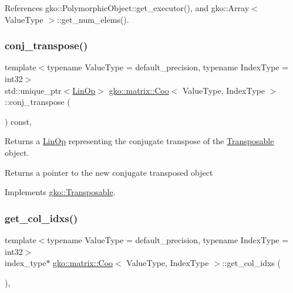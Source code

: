 References gko\+::\+Polymorphic\+Object\+::get\+\_\+executor(), and gko\+::\+Array$<$ Value\+Type $>$\+::get\+\_\+num\+\_\+elems().

\mbox{\label{classgko_1_1matrix_1_1Coo_ac1d91c524ca616b4c9e5f2a62f3f55ce}} 
\subsubsection{\texorpdfstring{conj\+\_\+transpose()}{conj\_transpose()}}
{\footnotesize\ttfamily template$<$typename Value\+Type = default\+\_\+precision, typename Index\+Type = int32$>$ \\
std\+::unique\+\_\+ptr$<$\hyperlink{classgko_1_1LinOp}{Lin\+Op}$>$ \hyperlink{classgko_1_1matrix_1_1Coo}{gko\+::matrix\+::\+Coo}$<$ Value\+Type, Index\+Type $>$\+::conj\+\_\+transpose (\begin{DoxyParamCaption}{ }\end{DoxyParamCaption}) const\hspace{0.3cm}{\ttfamily [override]}, {\ttfamily [virtual]}}



Returns a \hyperlink{classgko_1_1LinOp}{Lin\+Op} representing the conjugate transpose of the \hyperlink{classgko_1_1Transposable}{Transposable} object. 

\begin{DoxyReturn}{Returns}
a pointer to the new conjugate transposed object 
\end{DoxyReturn}


Implements \hyperlink{classgko_1_1Transposable_ab41b669288740cf2a6f7bf76e875b077}{gko\+::\+Transposable}.

\mbox{\label{classgko_1_1matrix_1_1Coo_a1b619cf23c7c87cb4109432c8e8db66d}} 
\subsubsection{\texorpdfstring{get\+\_\+col\+\_\+idxs()}{get\_col\_idxs()}}
{\footnotesize\ttfamily template$<$typename Value\+Type = default\+\_\+precision, typename Index\+Type = int32$>$ \\
index\+\_\+type$\ast$ \hyperlink{classgko_1_1matrix_1_1Coo}{gko\+::matrix\+::\+Coo}$<$ Value\+Type, Index\+Type $>$\+::get\+\_\+col\+\_\+idxs (\begin{DoxyParamCaption}{ }\end{DoxyParamCaption})\hspace{0.3cm}{\ttfamily [inline]}, {\ttfamily [noexcept]}}



